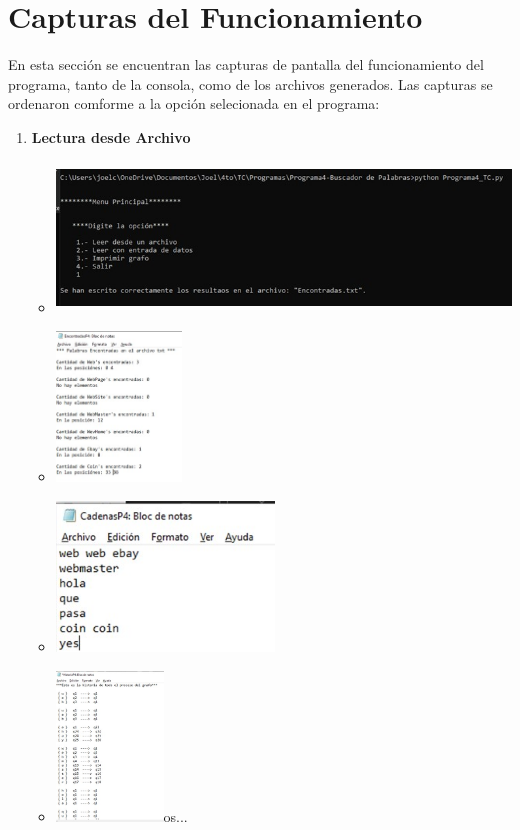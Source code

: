 \documentclass{article}
\begin{document}
	\section*{Capturas del Funcionamiento}
	En esta sección se encuentran las capturas de pantalla del funcionamiento del programa, tanto de la consola, como de los archivos generados.
	Las capturas se ordenaron comforme a la opción selecionada en el programa: 
	\begin{enumerate}
		\item \textbf{Lectura desde Archivo}
		\begin{itemize}
			\item \includegraphics[height = 4cm]{LA1.jpg}
			\item \includegraphics[height = 4cm]{LA2.jpg}
			\item \includegraphics[height = 4cm]{L4.jpg}
			\item \includegraphics[height = 4cm]{LA3.jpg}os...

\end{itemize}
\end{enumerate}
\end{document}

